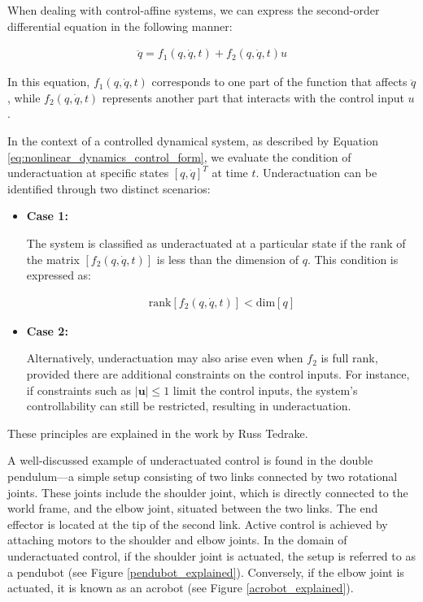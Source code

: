 When dealing with control-affine systems, we can express the second-order differential equation in the following manner:

\begin{align}
    \ddot{q} = f_1(q, \dot{q}, t) + f_2(q, \dot{q}, t)u
    \label{eq:nonlinear_dynamics_control_form}
\end{align}

In this equation, \( f_1(q, \dot{q}, t) \) corresponds to one part of the function that affects \( \ddot{q} \), while \( f_2(q, \dot{q}, t) \) represents another part that interacts with the control input \( u \).

In the context of a controlled dynamical system, as described by Equation \ref{eq:nonlinear_dynamics_control_form}, we evaluate the condition of underactuation at specific states \([q, \dot{q}]^T\) at time \(t\). Underactuation can be identified through two distinct scenarios:

\begin{itemize}
 \item \textbf{Case 1:}
 
 The system is classified as underactuated at a particular state if the rank of the matrix \([f_2(q, \dot{q}, t)]\) is less than the dimension of \(q\). This condition is expressed as:
 
 \begin{align}
    \text{rank}[f_2(q, \dot{q}, t)] < \text{dim}[q]
\end{align}
 
 \item \textbf{Case 2:} 
 
 Alternatively, underactuation may also arise even when \(f_2\) is full rank, provided there are additional constraints on the control inputs. For instance, if constraints such as \(|\mathbf{u}| \leq 1\) limit the control inputs, the system's controllability can still be restricted, resulting in underactuation.
\end{itemize}

These principles are explained in the work by Russ Tedrake\cite{tedrake2022underactuated}.

A well-discussed example of underactuated control is found in the double pendulum—a simple setup consisting of two links connected by two rotational joints. These joints include the shoulder joint, which is directly connected to the world frame, and the elbow joint, situated between the two links. The end effector is located at the tip of the second link. Active control is achieved by attaching motors to the shoulder and elbow joints. In the domain of underactuated control, if the shoulder joint is actuated, the setup is referred to as a pendubot (see Figure \ref{pendubot_explained}). Conversely, if the elbow joint is actuated, it is known as an acrobot (see Figure \ref{acrobot_explained}).

